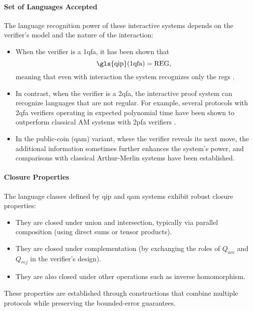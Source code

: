 \paragraph{Set of Languages Accepted}
The language recognition power of these interactive systems depends on the verifier's model and the nature of the interaction:
\begin{itemize}
  \item When the verifier is a \gls{1qfa}, it has been shown that
  \[
  \text{\gls{qip}(1qfa)} = \text{REG},
  \]
  meaning that even with interaction the system recognizes only the \glspl{reg} \cite{nishimura2009application}.
  \item In contrast, when the verifier is a \gls{2qfa}, the interactive proof system can recognize languages that are not regular. For example, several protocols with 2qfa verifiers operating in expected polynomial time have been shown to outperform classical AM systems with 2pfa verifiers \cite{zheng2015power, nishimura2015interactive}.
  \item In the public-coin (\gls{qam}) variant, where the verifier reveals its next move, the additional information sometimes further enhances the system's power, and comparisons with classical Arthur-Merlin systems have been established.
\end{itemize}

\paragraph{Closure Properties}
The language classes defined by \gls{qip} and \gls{qam} systems exhibit robust closure properties:
\begin{itemize}
  \item They are closed under union and intersection, typically via parallel composition (using direct sums or tensor products).
  \item They are closed under complementation (by exchanging the roles of $Q_{acc}$ and $Q_{rej}$ in the verifier's design).
  \item They are also closed under other operations such as inverse homomorphism.
\end{itemize}
These properties are established through constructions that combine multiple protocols while preserving the bounded-error guarantees.

